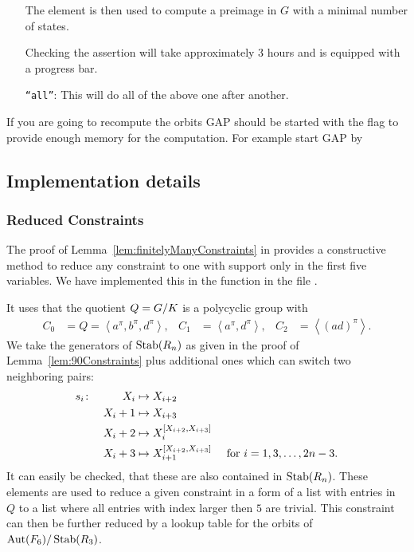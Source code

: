\documentclass[a4paper,11pt]{amsart}
\begin{document}
\begin{itemize}
		      The element is then used to compute a preimage in $G$ with a minimal 
		      number of states.

		      Checking the assertion will take approximately $3$ hours and is equipped 
		      with a progress bar. 
  \item [\texttt{``all''}:] This will do all of the above one after another.		      
   \end{itemize}
If you are going to recompute the orbits GAP should be started with the  flag
to provide enough memory for the computation. For example start GAP by 


\subsection{Implementation details}
\label{sec:gap_details}
\subsubsection{Reduced Constraints}
The proof of Lemma~\ref{lem:finitelyManyConstraints} in \cite{Lysenok:QudraticEquationsInGrig} 
provides a constructive method to reduce any constraint to one with support
only in the first five variables. 
We have implemented this in the function  in the file
.

It uses that the quotient $Q={G/K}$ is a polycyclic group with 
\begin{align*}
 C_0 &= Q = \left<a^\pi,b^\pi,d^\pi\right>, &
 C_1 &= \left<a^\pi,d^\pi\right>, &
 C_2 &= \left<(ad)^\pi\right>.
\end{align*}
We take the generators of $\operatorname{Stab}(R_n)$ as given in the proof of Lemma~\ref{lem:90Constraints}
plus additional ones which can switch two neighboring pairs:
\begin{align*}
 s_i &\colon &X_i&\mapsto X_{i+2}&\\
	    &&X_i+1&\mapsto X_{i+3}&\\
	    &&X_i+2&\mapsto X_{i}^{[X_{i+2},X_{i+3}]}&\\
	    &&X_i+3&\mapsto X_{i+1}^{[X_{i+2},X_{i+3}]} & \textup{ for }i = 1,3,\dotsc,2n-3.
\end{align*}
It can easily be checked, that these are also contained in $\operatorname{Stab}(R_n)$. These elements
are used to reduce a given constraint in a form of a list with entries in $Q$ to a
list where all entries with index larger then $5$ are trivial. 
This constraint can then be further reduced by a lookup table for the orbits
of ${\operatorname{{Aut}}(F_6)/\operatorname{Stab}(R_3)}$. 
\end{document}
